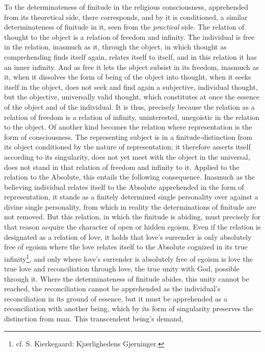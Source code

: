 \documentclass[12pt,a4paper]{book}
\begin{document}
To the determinateness of finitude in the religious consciousness, apprehended
from its theoretical side, there corresponds, and by it is conditioned, a similar
determinateness of finitude in it, seen from the \emph{practical} side. The
relation of thought to the object is a relation of freedom and infinity. The
individual is free in the relation, inasmuch as it, through the object, in which
thought as comprehending finds itself again, relates itself to itself, and in
this relation it has an inner infinity. And as free it lets the object subsist in
its freedom, inasmuch as it, when it dissolves the form of being of the object
into thought, when it seeks itself in the object, does not seek and find again a
subjective, individual thought, but the objective, universally valid thought,
which constitutes at once the essence of the object and of the individual. It is
thus, precisely because the relation as a relation of freedom is a relation of
infinity, uninterested, unegoistic in the relation to the object. Of another kind
becomes the relation where representation is the form of consciousness. The
representing subject is in a finitude-distinction from its object conditioned by
the nature of representation; it therefore asserts itself according to its
singularity, does not yet meet with the object in the universal, does not stand
in that relation of freedom and infinity to it. Applied to the relation to the
Absolute, this entails the following consequence. Inasmuch as the believing
individual relates itself to the Absolute apprehended in the form of
representation, it stands as a finitely determined single personality over against
a divine single personality, from which in reality the determinations of finitude
are not removed. But this relation, in which the finitude is abiding, must
precisely for that reason acquire the character of open or hidden egoism. Even if
the relation is designated as a relation of love, it holds that love's surrender
is only absolutely free of egoism where the love relates itself to the Absolute
cognized in its true infinity\footnote{cf. S. Kierkegaard:
Kjærlighedens Gjerninger.}, and only where love's surrender is
absolutely free of egoism is love the true love and reconciliation through love,
the true unity with God, possible through it. Where the determinateness of
finitude abides, this unity cannot be reached, the reconciliation cannot be
apprehended as the individual's reconciliation in its ground of essence, but it
must be apprehended as a reconciliation with another being, which by its form of
singularity preserves the distinction from man. This transcendent being's demand,
\end{document}
